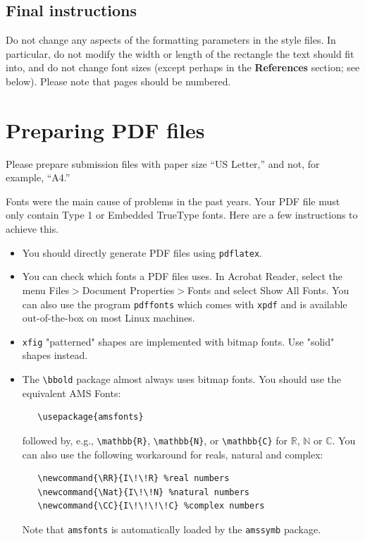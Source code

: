 \documentclass{article}
\begin{document}
\begin{CJK}{UTF8}{gbsn}
\subsection{Final instructions}

Do not change any aspects of the formatting parameters in the style files.  In
particular, do not modify the width or length of the rectangle the text should
fit into, and do not change font sizes (except perhaps in the
\textbf{References} section; see below). Please note that pages should be
numbered.


\section{Preparing PDF files}


Please prepare submission files with paper size ``US Letter,'' and not, for
example, ``A4.''


Fonts were the main cause of problems in the past years. Your PDF file must only
contain Type 1 or Embedded TrueType fonts. Here are a few instructions to
achieve this.


\begin{itemize}


\item You should directly generate PDF files using \verb+pdflatex+.


\item You can check which fonts a PDF files uses.  In Acrobat Reader, select the
  menu Files$>$Document Properties$>$Fonts and select Show All Fonts. You can
  also use the program \verb+pdffonts+ which comes with \verb+xpdf+ and is
  available out-of-the-box on most Linux machines.


\item \verb+xfig+ "patterned" shapes are implemented with bitmap fonts.  Use
  "solid" shapes instead.


\item The \verb+\bbold+ package almost always uses bitmap fonts.  You should use
  the equivalent AMS Fonts:
\begin{verbatim}
   \usepackage{amsfonts}
\end{verbatim}
followed by, e.g., \verb+\mathbb{R}+, \verb+\mathbb{N}+, or \verb+\mathbb{C}+
for $\mathbb{R}$, $\mathbb{N}$ or $\mathbb{C}$.  You can also use the following
workaround for reals, natural and complex:
\begin{verbatim}
   \newcommand{\RR}{I\!\!R} %real numbers
   \newcommand{\Nat}{I\!\!N} %natural numbers
   \newcommand{\CC}{I\!\!\!\!C} %complex numbers
\end{verbatim}
Note that \verb+amsfonts+ is automatically loaded by the \verb+amssymb+ package.



\end{itemize}
\end{CJK}
\end{document}
